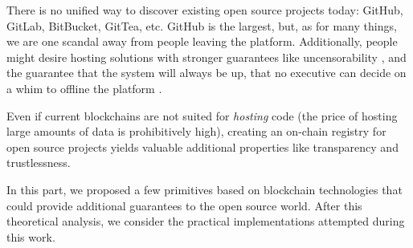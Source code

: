 There is no unified way to discover existing open source projects today: GitHub, GitLab, BitBucket, GitTea, etc.
GitHub is the largest, but, as for many things, we are one scandal away from people leaving the platform.
Additionally, people might desire hosting solutions with stronger guarantees like uncensorability%
, and the guarantee that the system will always be up, that no executive can decide on a whim to offline the platform%
.
\marginElement{\vspace*{.392\paperheight}}

Even if current blockchains are not suited for \emph{hosting} code (the price of hosting large amounts of data is prohibitively high), creating an on-chain registry for open source projects yields valuable additional properties like transparency and trustlessness.

\null\vfill
\drawBackground
\startBackground
\begin{fullwidth}
  In this part, we proposed a few primitives based on blockchain technologies that could provide additional guarantees to the open source world.
  After this theoretical analysis, we consider the practical implementations attempted during this work.
\end{fullwidth}
\vspace*{2mm}
\stopBackground
\vfill\null

